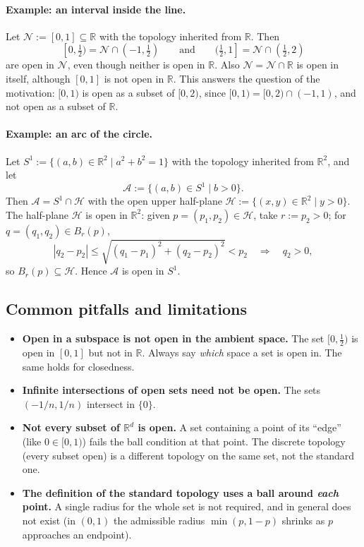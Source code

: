 \documentclass[11pt]{article}
\begin{document}
\paragraph{Example: an interval inside the line.} Let $\mathcal N:=[0,1]\subseteq\mathbb R$ with the topology inherited from $\mathbb R$. Then
\[
[0,\tfrac12)=\mathcal N\cap(-1,\tfrac12)
\qquad\text{and}\qquad
(\tfrac12,1]=\mathcal N\cap(\tfrac12,2)
\]
are open in $\mathcal N$, even though neither is open in $\mathbb R$. Also $\mathcal N=\mathcal N\cap\mathbb R$ is open in itself, although $[0,1]$ is not open in $\mathbb R$. This answers the question of the motivation: $[0,1)$ is open as a subset of $[0,2)$, since $[0,1)=[0,2)\cap(-1,1)$, and not open as a subset of $\mathbb R$.

\paragraph{Example: an arc of the circle.} Let $S^1:=\{(a,b)\in\mathbb R^2\mid a^2+b^2=1\}$ with the topology inherited from $\mathbb R^2$, and let
\[
\mathcal A:=\{(a,b)\in S^1\mid b>0\}.
\]
Then $\mathcal A=S^1\cap\mathcal H$ with the open upper half-plane $\mathcal H:=\{(x,y)\in\mathbb R^2\mid y>0\}$. The half-plane $\mathcal H$ is open in $\mathbb R^2$: given $p=(p_1,p_2)\in\mathcal H$, take $r:=p_2>0$; for $q=(q_1,q_2)\in B_r(p)$,
\[
|q_2-p_2|\le\sqrt{(q_1-p_1)^2+(q_2-p_2)^2}<p_2
\quad\Longrightarrow\quad
q_2>0,
\]
so $B_r(p)\subseteq\mathcal H$. Hence $\mathcal A$ is open in $S^1$.

\subsection*{Common pitfalls and limitations}

\begin{itemize}
  \item \textbf{Open in a subspace is not open in the ambient space.} The set $[0,\tfrac12)$ is open in $[0,1]$ but not in $\mathbb R$. Always say \emph{which} space a set is open in. The same holds for closedness.
  \item \textbf{Infinite intersections of open sets need not be open.} The sets $(-1/n,1/n)$ intersect in $\{0\}$.
  \item \textbf{Not every subset of $\mathbb R^d$ is open.} A set containing a point of its ``edge'' (like $0\in[0,1)$) fails the ball condition at that point. The discrete topology (every subset open) is a different topology on the same set, not the standard one.
  \item \textbf{The definition of the standard topology uses a ball around \emph{each} point.} A single radius for the whole set is not required, and in general does not exist (in $(0,1)$ the admissible radius $\min(p,1-p)$ shrinks as $p$ approaches an endpoint).
\end{itemize}
\end{document}
